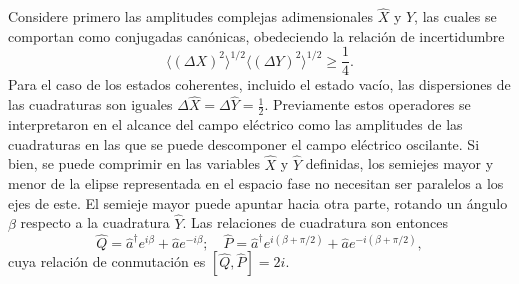 Considere primero las amplitudes complejas adimensionales $\hat{X}$ y $\hat{Y}$, las cuales se comportan como conjugadas canónicas, obedeciendo la relación de incertidumbre
\begin{equation}
  \langle (\Delta X)^2 \rangle ^{1/2} \langle (\Delta Y)^2 \rangle ^{1/2} \geq \frac{1}{4}.
\end{equation}
Para el caso de los estados coherentes, incluido el estado vacío, las dispersiones de las cuadraturas son iguales $\Delta \hat{X} = \Delta \hat{Y} = \frac{1}{2}$. Previamente estos operadores se interpretaron en el alcance del campo eléctrico como las amplitudes de las cuadraturas en las que se puede descomponer el campo eléctrico oscilante. Si bien, se puede comprimir en las variables $\hat{X}$ y $\hat{Y}$ definidas, los semiejes mayor y menor de la elipse representada en el espacio fase no necesitan ser paralelos a los ejes de este. El semieje mayor puede apuntar hacia otra parte, rotando un ángulo $\beta$ respecto a la cuadratura $\hat{Y}$. Las relaciones de cuadratura son entonces
\begin{equation}
  \hat{Q} = \hat{a}^{\dagger} e^{i\beta} + \hat{a} e^{-i\beta}; \quad \hat{P} = \hat{a}^{\dagger} e^{i(\beta + \pi/2)} + \hat{a} e^{-i(\beta + \pi/2)},
\end{equation}
cuya relación de conmutación es $[\hat{Q}, \hat{P}] = 2i$.

